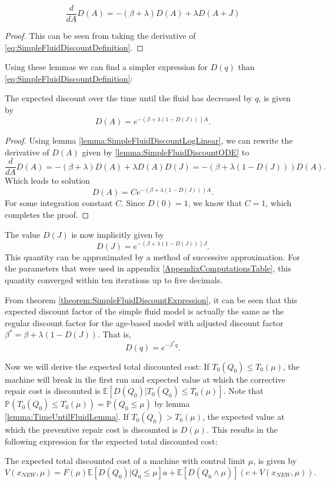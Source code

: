 \begin{lemma}\label{lemma:SimpleFluidDiscountODE}
	$$\frac{d}{dA}D(A)=-(\beta+\lambda)D(A)+\lambda D(A+J)$$
	\begin{proof}
		This can be seen from taking the derivative of \eqref{eq:SimpleFluidDiscountDefinition}.
	\end{proof}
\end{lemma}
Using these lemmas we can find a simpler expression for $D(q)$ than \eqref{eq:SimpleFluidDiscountDefinition}:
\begin{theorem}\label{theorem:SimpleFluidDiscountExpression}
	The expected discount over the time until the fluid has decreased by $q$, is given by
	\[
	D(A)=e^{-(\beta+\lambda(1-D(J)))A}.
	\]
	\begin{proof}
		Using lemma \ref{lemma:SimpleFluidDiscountLogLinear}, we can rewrite the derivative of $D(A)$ given by \ref{lemma:SimpleFluidDiscountODE} to
		\[
		\frac{d}{dA}D(A)=-(\beta+\lambda)D(A)+\lambda D(A)D(J)=-(\beta+\lambda(1-D(J)))D(A).
		\]
		Which leads to solution
		\[
		D(A)=Ce^{-(\beta+\lambda(1-D(J)))A}.
		\]
		For some integration constant $C$. Since $D(0)=1$, we know that $C=1$, which completes the proof.
	\end{proof}
\end{theorem}
\begin{corollary}
	The value $D(J)$ is now implicitly given by
	\[
	D(J)=e^{-(\beta+\lambda(1-D(J)))J}.
	\]
	This quantity can be approximated by a method of successive approximation.
	For the parameters that were used in appendix \ref{AppendixComputationsTable}, this quantity converged within ten iterations up to five decimals.
\end{corollary}
\begin{remark}\label{remark:SimpleFluidDiscountEquivalence}
	From theorem \ref{theorem:SimpleFluidDiscountExpression}, it can be seen that this expected discount factor of the simple fluid model is actually the same as the regular discount factor for the age-based model with adjusted discount factor $\beta^*=\beta+\lambda(1-D(J))$.
	That is,
	\[
	D(q)=e^{-\beta^*q}.
	\]
\end{remark}

Now we will derive the expected total discounted cost:
If $T_0(Q_0)\leq T_0(\mu)$, the machine will break in the first run and expected value at which the corrective repair cost is discounted is $\mathbb{E}[D(Q_0)|T_0(Q_0)\leq T_0(\mu)]$.
Note that $\mathbb{P}(T_0(Q_0)\leq T_0(\mu))=\mathbb{P}(Q_0\leq\mu)$ by lemma \ref{lemma:TimeUntilFluidLemma}.
If $T_0(Q_0)> T_0(\mu)$, the expected value at which the preventive repair cost is discounted is $D(\mu)$.
This results in the following expression for the expected total discounted cost:
\begin{theorem}
	The expected total discounted cost of a machine with control limit $\mu$, is given by
	\begin{equation}\label{eq:SimpleFluidImplicitTDC}
	V(x_{NEW},\mu)=F(\mu)\mathbb{E}[D(Q_0)|Q_0\leq \mu]a+\mathbb{E}[D(Q_0\wedge\mu)](c+V(x_{NEW},\mu)).
	\end{equation}
\end{theorem}

